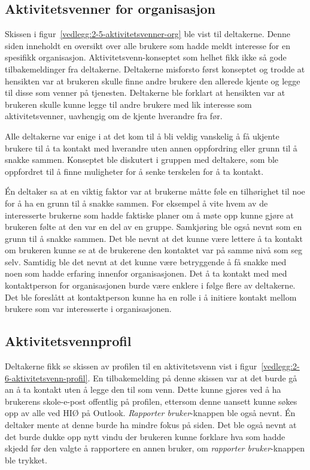 \subsection{Aktivitetsvenner for organisasjon}

Skissen i figur~\ref{vedlegg:2-5-aktivitetsvenner-org} ble vist til deltakerne. Denne siden inneholdt en oversikt over alle brukere som hadde meldt interesse for en spesifikk organisasjon. Aktivitetsvenn-konseptet som helhet fikk ikke så gode tilbakemeldinger fra deltakerne. Deltakerne misforsto først konseptet og trodde at hensikten var at brukeren skulle finne andre brukere den allerede kjente og legge til disse som venner på tjenesten. Deltakerne ble forklart at hensikten var at brukeren skulle kunne legge til andre brukere med lik interesse som aktivitetsvenner, uavhengig om de kjente hverandre fra før. 

Alle deltakerne var enige i at det kom til å bli veldig vanskelig å få ukjente brukere til å ta kontakt med hverandre uten annen oppfordring eller grunn til å snakke sammen. Konseptet ble diskutert i gruppen med deltakere, som ble oppfordret til å finne muligheter for å senke terskelen for å ta kontakt. 

Én deltaker sa at en viktig faktor var at brukerne måtte føle en tilhørighet til noe for å ha en grunn til å snakke sammen. For eksempel å vite hvem av de interesserte brukerne som hadde faktiske planer om å møte opp kunne gjøre at brukeren følte at den var en del av en gruppe. Samkjøring ble også nevnt som en grunn til å snakke sammen. Det ble nevnt at det kunne være lettere å ta kontakt om brukeren kunne se at de brukerene den kontaktet var på samme nivå som seg selv. Samtidig ble det nevnt at det kunne være betryggende å få snakke med noen som hadde erfaring innenfor organisasjonen. Det å ta kontakt med med kontaktperson for organisasjonen burde være enklere i følge flere av deltakerne. Det ble foreslått at kontaktperson kunne ha en rolle i å initiere kontakt mellom brukere som var interesserte i organisasjonen.


\subsection{Aktivitetsvennprofil}

Deltakerne fikk se skissen av profilen til en aktivitetsvenn vist i figur~\ref{vedlegg:2-6-aktivitetsvenn-profil}. En tilbakemelding på denne skissen var at det burde gå an å ta kontakt uten å legge den til som venn. Dette kunne gjøres ved å ha brukerens skole-e-post offentlig på profilen, ettersom denne uansett kunne søkes opp av alle ved HIØ på Outlook. {\em Rapporter bruker}-knappen ble også nevnt. Én deltaker mente at denne burde ha mindre fokus på siden. Det ble også nevnt at det burde dukke opp nytt vindu der brukeren kunne forklare hva som hadde skjedd før den valgte å rapportere en annen bruker, om {\em rapporter bruker}-knappen ble trykket.


